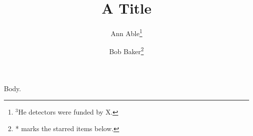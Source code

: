 \documentclass[journal]{IEEEtran}
\begin{document}
\title{A Title}
\author{Ann Able\thanks{$^{3}$He detectors were funded by X.} \and Bob Baker\thanks{* marks the starred items below.}}
\maketitle
Body.
\end{document}
